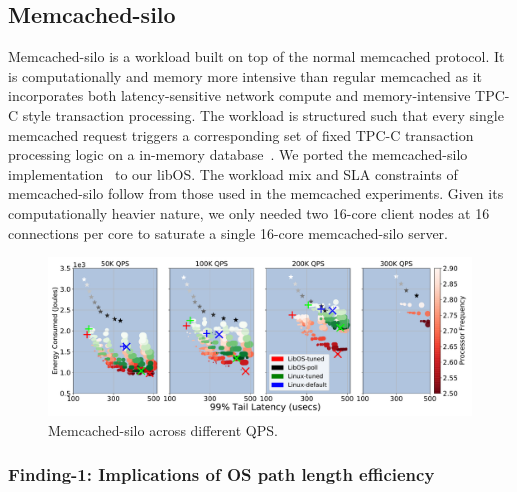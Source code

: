 \subsection{Memcached-silo}
\label{sec:mcdsilo}

Memcached-silo is a workload built on top of the normal memcached protocol. It is computationally and memory more intensive than regular memcached as it incorporates both latency-sensitive network compute and memory-intensive TPC-C style transaction processing. The workload is structured such that every single memcached request triggers a corresponding set of fixed TPC-C transaction processing logic on a in-memory database~\cite{silo}. We ported the memcached-silo implementation~\cite{mcdsilo, zygos} to our libOS. The workload mix and SLA constraints of memcached-silo follow from those used in the memcached experiments. Given its computationally heavier nature, we only needed two 16-core client nodes at 16 connections per core to saturate a single 16-core memcached-silo server. 

\begin{figure}
\centering
\includegraphics[width=1\textwidth]{figures/mcdsilo_overview}
\caption[]
{Memcached-silo across different QPS.}
\label{fig:mcdsilo_overview}
\end{figure}

\subsubsection{Finding-1: Implications of OS path length efficiency}
